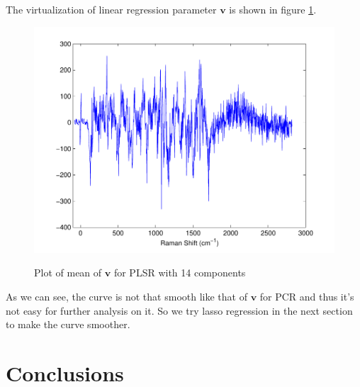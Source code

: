 \documentclass[a4paper]{article}
\newcommand{\bfv}{\mathbf{v}}
\begin{document}
The virtualization of linear regression parameter $\bfv$ is shown in figure \ref{pic7}.
\begin{figure}[h]
  \centering
  \includegraphics[width=.6\textwidth]{images/v_plsrnormcmp14smse007519.pdf}\\
  \caption{Plot of mean of $\bfv$ for PLSR with 14 components}\label{pic7}
\end{figure}

As we can see, the curve is not that smooth like that of $\bfv$ for PCR and thus it's not easy for further analysis on it. So we try lasso regression in the next section to make the curve smoother.

\section{Conclusions}
\end{document}
